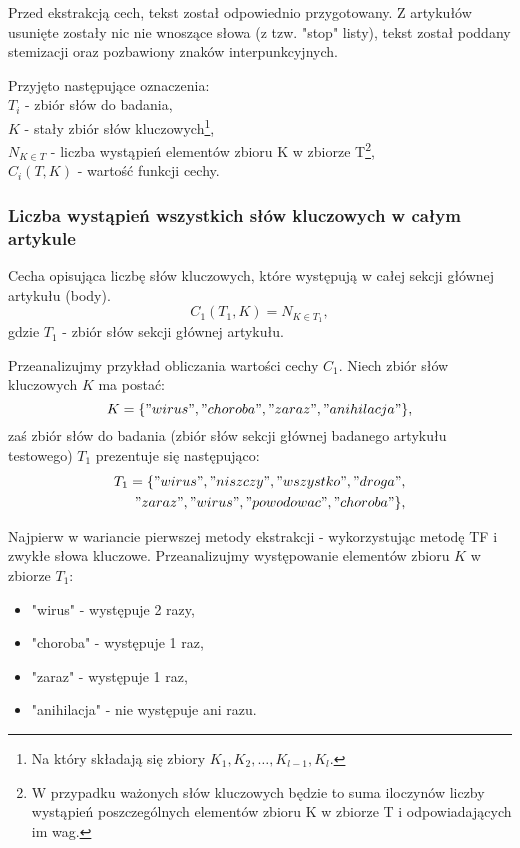 \documentclass{classrep}
\begin{document}
Przed ekstrakcją cech, tekst został odpowiednio przygotowany. Z artykułów usunięte zostały nic nie wnoszące słowa (z tzw. "stop" listy), tekst został poddany stemizacji oraz pozbawiony znaków interpunkcyjnych. \newline

Przyjęto następujące oznaczenia:\\
    \quad $T_{i}$ - zbiór słów do badania,\\
    \quad $K$ - stały zbiór słów kluczowych\footnote{Na który składają się zbiory ${K_{1}, K_{2}, \ldots , K_{l-1}, K_{l}.}$}, \\
    \quad $N_{K \in T}$ - liczba wystąpień elementów zbioru K w zbiorze T\footnote{W przypadku ważonych słów kluczowych będzie to suma iloczynów liczby wystąpień poszczególnych elementów zbioru K w zbiorze T i odpowiadających im wag.}, \\
    \quad $C_{i}(T,K)$ - wartość funkcji cechy. \\


\subsubsection{Liczba wystąpień wszystkich słów kluczowych w całym artykule}
Cecha opisująca liczbę słów kluczowych, które występują w całej sekcji głównej artykułu (body).
\begin{equation}
            C_{1}(T_{1},K) = N_{K \in T_{1}},
 \end{equation}	
 gdzie $T_{1}$ - zbiór słów sekcji głównej artykułu. \newline

Przeanalizujmy przykład obliczania wartości cechy $C_{1}$. Niech zbiór słów kluczowych $K$ ma postać:
\begin{equation}
K = \{{"wirus", "choroba", "zaraz", "anihilacja"}\},
 \end{equation}	
zaś zbiór słów do badania (zbiór słów sekcji głównej badanego artykułu testowego) $T_{1}$ prezentuje się następująco:
\begin{equation}
\begin{split}
T_{1} = \{{"wirus", "niszczy", "wszystko", "droga",}\\ 
{"zaraz", "wirus", "powodowac", "choroba"}\},
\end{split}
\end{equation}	

Najpierw w wariancie pierwszej metody ekstrakcji - wykorzystując metodę TF i zwykłe słowa kluczowe. Przeanalizujmy występowanie elementów zbioru $K$  w zbiorze $T_{1}$:
\begin{itemize}[label=$\bullet$\scshape\bfseries]
\item "wirus" - występuje 2 razy,
\item "choroba" - występuje 1 raz,
\item "zaraz" - występuje 1 raz,
\item "anihilacja" - nie występuje ani razu.
\end{itemize}
\end{document}
